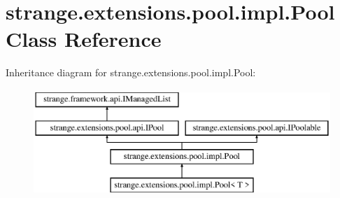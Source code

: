 \hypertarget{classstrange_1_1extensions_1_1pool_1_1impl_1_1_pool}{\section{strange.\-extensions.\-pool.\-impl.\-Pool Class Reference}
\label{classstrange_1_1extensions_1_1pool_1_1impl_1_1_pool}
}
Inheritance diagram for strange.\-extensions.\-pool.\-impl.\-Pool\-:\begin{figure}[H]
\begin{center}
\leavevmode
\includegraphics[height=4.000000cm]{classstrange_1_1extensions_1_1pool_1_1impl_1_1_pool}
\end{center}
\end{figure}
